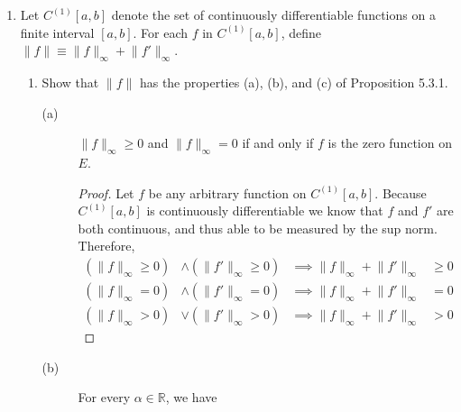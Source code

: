 \documentclass{article}
\begin{document}
\begin{enumerate}
\begin{enumerate}
\begin{proof}
                        \end{proof}
            \end{enumerate}
            \setcounter{enumi}{6}
      \item Let $C^{(1)}[a,b]$ denote the set of continuously differentiable
            functions on a finite interval $[a,b]$. For each $f$ in
            $C^{(1)}[a,b]$, define $\lVert f\rVert \equiv \lVert f\rVert_\infty
                  + \lVert f'\rVert_\infty$.
            \begin{enumerate}
                  \item Show that $\lVert f\rVert$ has the properties (a), (b),
                        and (c) of Proposition 5.3.1.
                        \begin{description}
                              \item[(a)] $\lVert f\rVert_\infty\geq 0$ and
                                    $\lVert f\rVert_\infty=0$ if and only if $f$
                                    is the zero function on $E$.
                                    \begin{proof}
                                          Let $f$ be any arbitrary function on
                                          $C^{(1)}[a,b]$. Because $C^{(1)}[a,b]$
                                          is continuously differentiable we know
                                          that $f$ and $f'$ are both continuous,
                                          and thus able to be measured by the sup
                                          norm. Therefore,
                                          \begin{align*}
                                                (\lVert f\rVert_\infty \geq 0) & \land (\lVert f'\rVert_\infty  \geq 0) & \implies\lVert f\rVert_\infty + \lVert f'\rVert_\infty & \geq 0 \\
                                                (\lVert f\rVert_\infty = 0)    & \land (\lVert f'\rVert_\infty  = 0)    & \implies\lVert f\rVert_\infty + \lVert f'\rVert_\infty & = 0    \\
                                                (\lVert f\rVert_\infty > 0)    & \lor (\lVert f'\rVert_\infty  > 0)     & \implies\lVert f\rVert_\infty + \lVert f'\rVert_\infty & > 0
                                          \end{align*}
                                    \end{proof}
                              \item[(b)] For every $\alpha\in\mathbb{R}$, we have

\end{description}
\end{enumerate}
\end{enumerate}
\end{document}

